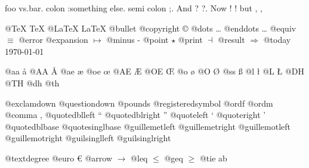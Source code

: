 \documentclass{book}
\begin{document}
foo vs.\@ bar. 
colon :\@And something else.
semi colon ;\@.
And ? ?\@.
Now ! !\@@
but , ,\@

@TeX \TeX{}
@LaTeX \LaTeX{}
@bullet \textbullet{}
@copyright \copyright{}
@dots \dots{}\@
@enddots \dots{}
@equiv $\equiv{}$
@error 
@expansion $\mapsto{}$
@minus -
@point $\star{}$
@print $\dashv{}$
@result $\Rightarrow{}$
@today \today{}

@aa \aa{}
@AA \AA{}
@ae \ae{}
@oe \oe{}
@AE \AE{}
@OE \OE{}
@o \o{}
@O \O{}
@ss \ss{}
@l \l{}
@L \L{}
@DH \DH{}
@TH \TH{}
@dh \dh{}
@th \th{}

@exclamdown \textexclamdown{}
@questiondown \textquestiondown{}
@pounds \textsterling{}
@registeredsymbol \circledR{}
@ordf \textordfeminine{}
@ordm \textordmasculine{}
@comma ,
@quotedblleft \textquotedblleft{}
@quotedblright \textquotedblright{}
@quoteleft \textquoteleft{}
@quoteright \textquoteright{}
@quotedblbase \quotedblbase{}
@quotesinglbase \quotesinglbase{}
@guillemetleft \guillemotleft{}
@guillemetright \guillemotright{}
@guillemotleft \guillemotleft{}
@guillemotright \guillemotright{}
@guilsinglleft \guilsinglleft{}
@guilsinglright \guilsinglright{}

@textdegree \textdegree{}
@euro \euro{}
@arrow $\rightarrow{}$
@leq $\leq{}$
@geq $\geq{}$
@tie a\hbox{}b
\end{document}
